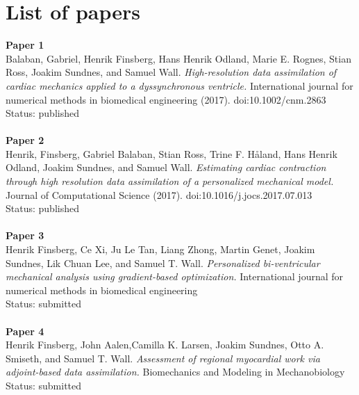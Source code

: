 
\section*{List of papers}

\textbf{Paper 1}
\hfill  \\ \noindent
Balaban, Gabriel, Henrik Finsberg, Hans Henrik Odland, Marie
E. Rognes, Stian Ross, Joakim Sundnes, and Samuel
Wall. \emph{High-resolution data assimilation of cardiac mechanics
  applied to a dyssynchronous ventricle.}  International journal for
numerical methods in biomedical engineering
(2017). doi:10.1002/cnm.2863
Status: published
\\\\
\noindent
\textbf{Paper 2} 
\hfill  \\ 
Henrik, Finsberg, Gabriel Balaban,  Stian Ross, Trine F. H\r{a}land,
Hans Henrik Odland, Joakim Sundnes, and Samuel
Wall. \emph{Estimating cardiac contraction through high resolution
  data assimilation of a personalized mechanical model.} Journal of
Computational Science (2017). doi:10.1016/j.jocs.2017.07.013
\\Status: published
\\\\
\noindent
\textbf{Paper 3}
\hfill  \\
Henrik Finsberg, Ce Xi,  Ju Le Tan,  Liang Zhong, Martin Genet, Joakim
Sundnes, Lik Chuan Lee, and Samuel T. Wall.
\emph{Personalized bi-ventricular mechanical analysis using
  gradient-based optimization.} International journal for
numerical methods in biomedical engineering
\\Status: submitted
\\\\
\noident
\textbf{Paper 4}
\hfill  \\
Henrik Finsberg, John Aalen,Camilla K.
Larsen, Joakim Sundnes, Otto A. Smiseth, and 
Samuel T. Wall.
\emph{Assessment of regional myocardial work via adjoint-based
  data assimilation.} Biomechanics and Modeling in Mechanobiology
\\Status: submitted

